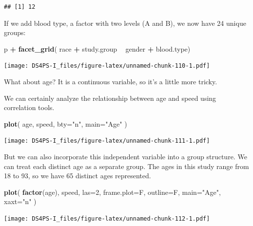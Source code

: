 \documentclass[]{book}
\newenvironment{Shaded}{\begin{snugshade}}{\end{snugshade}}
\newcommand{\DataTypeTok}[1]{\textcolor[rgb]{0.13,0.29,0.53}{#1}}
\newcommand{\DecValTok}[1]{\textcolor[rgb]{0.00,0.00,0.81}{#1}}
\newcommand{\KeywordTok}[1]{\textcolor[rgb]{0.13,0.29,0.53}{\textbf{#1}}}
\newcommand{\NormalTok}[1]{#1}
\newcommand{\OperatorTok}[1]{\textcolor[rgb]{0.81,0.36,0.00}{\textbf{#1}}}
\newcommand{\StringTok}[1]{\textcolor[rgb]{0.31,0.60,0.02}{#1}}
\theoremstyle{definition}
\theoremstyle{definition}
\theoremstyle{definition}
\theoremstyle{remark}
\begin{document}
\begin{verbatim}
## [1] 12
\end{verbatim}

If we add blood type, a factor with two levels (A and B), we now have 24
unique groups:

\begin{Shaded}
\begin{Highlighting}[]
\NormalTok{p }\OperatorTok{+}\StringTok{ }\KeywordTok{facet_grid}\NormalTok{( race }\OperatorTok{+}\StringTok{ }\NormalTok{study.group }\OperatorTok{~}\StringTok{ }\NormalTok{gender }\OperatorTok{+}\StringTok{ }\NormalTok{blood.type) }
\end{Highlighting}
\end{Shaded}

\texttt{[image: DS4PS-I\_files/figure-latex/unnamed-chunk-110-1.pdf]}

What about age? It is a continuous variable, so it's a little more
tricky.

We can certainly analyze the relationship between age and speed using
correlation tools.

\begin{Shaded}
\begin{Highlighting}[]
\KeywordTok{plot}\NormalTok{( age, speed, }\DataTypeTok{bty=}\StringTok{"n"}\NormalTok{, }\DataTypeTok{main=}\StringTok{"Age"}\NormalTok{ )}
\end{Highlighting}
\end{Shaded}

\texttt{[image: DS4PS-I\_files/figure-latex/unnamed-chunk-111-1.pdf]}

But we can also incorporate this independent variable into a group
structure. We can treat each distinct age as a separate group. The ages
in this study range from 18 to 93, so we have 65 distinct ages
represented.

\begin{Shaded}
\begin{Highlighting}[]
\KeywordTok{plot}\NormalTok{( }\KeywordTok{factor}\NormalTok{(age), speed, }\DataTypeTok{las=}\DecValTok{2}\NormalTok{, }\DataTypeTok{frame.plot=}\NormalTok{F, }\DataTypeTok{outline=}\NormalTok{F, }\DataTypeTok{main=}\StringTok{"Age"}\NormalTok{, }\DataTypeTok{xaxt=}\StringTok{"n"}\NormalTok{  )}
\end{Highlighting}
\end{Shaded}

\texttt{[image: DS4PS-I\_files/figure-latex/unnamed-chunk-112-1.pdf]}
\end{document}
